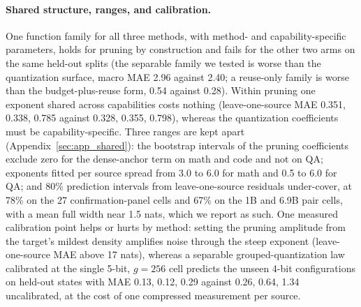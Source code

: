 \paragraph{Shared structure, ranges, and calibration.} One function
family for all three methods, with method- and capability-specific
parameters, holds for pruning by construction and fails for the other
two arms on the same held-out splits (the separable family we tested
is worse than the quantization surface, macro MAE 2.96 against 2.40;
a reuse-only family is worse than the budget-plus-reuse form, 0.54
against 0.28). Within pruning one exponent shared across capabilities
costs nothing (leave-one-source MAE 0.351, 0.338, 0.785 against 0.328,
0.355, 0.798), whereas the quantization coefficients must be
capability-specific. Three ranges are kept apart
(Appendix~\ref{sec:app_shared}): the bootstrap intervals of the
pruning coefficients exclude zero for the dense-anchor term on math
and code and not on QA; exponents fitted per source spread from 3.0
to 6.0 for math and 0.5 to 6.0 for QA; and 80\% prediction intervals
from leave-one-source residuals under-cover, at 78\% on the 27
confirmation-panel cells and 67\% on the 1B and 6.9B pair cells, with
a mean full width near 1.5 nats, which we report as such. One
measured calibration point helps or hurts by method: setting the
pruning amplitude from the target's mildest density amplifies noise
through the steep exponent (leave-one-source MAE above 17 nats),
whereas a separable grouped-quantization law calibrated at the single
5-bit, $g=256$ cell predicts the unseen 4-bit configurations on
held-out states with MAE 0.13, 0.12, 0.29 against 0.26, 0.64, 1.34
uncalibrated, at the cost of one compressed measurement per source.

\FloatBarrier
